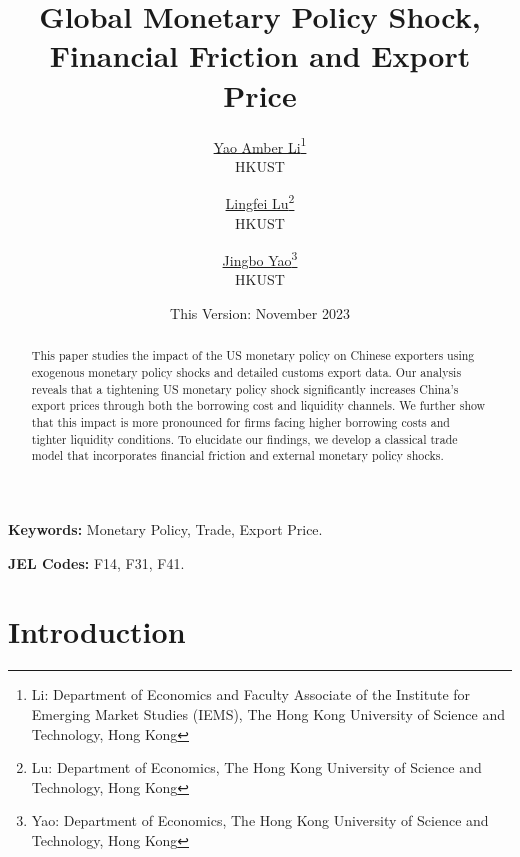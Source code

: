 

\linespread{1.2}
\geometry{a4paper,scale=0.75}
\setlength{\parskip}{0.5em}




\title{\Large \textbf{Global Monetary Policy Shock, Financial Friction and Export Price}}

\author{\large \href{http://yaoli.people.ust.hk/}{Yao Amber Li}\thanks{Li: Department of Economics and Faculty Associate of the Institute for Emerging Market Studies (IEMS), The Hong Kong University of Science and Technology, Hong Kong}\\ \large{HKUST}
\medskip
\and \href{}{Lingfei Lu}\thanks{Lu: Department of Economics, The Hong Kong University of Science and Technology, Hong Kong } \\ \large{HKUST}
\medskip
\and \href{}{Jingbo Yao}\thanks{Yao: Department of Economics, The Hong Kong University of Science and Technology, Hong Kong} \\ \large{HKUST}
}
\date{This Version: November 2023}

\maketitle

\begin{abstract}
This paper studies the impact of the US monetary policy on Chinese exporters using exogenous monetary policy shocks and detailed customs export data. Our analysis reveals that a tightening US monetary policy shock significantly increases China's export prices through both the borrowing cost and liquidity channels. We further show that this impact is more pronounced for firms facing higher borrowing costs and tighter liquidity conditions. To elucidate our findings, we develop a classical trade model that incorporates financial friction and external monetary policy shocks.

\end{abstract}

\textbf{Keywords:} Monetary Policy, Trade, Export Price.

\textbf{JEL Codes:} F14, F31, F41.
\newpage

\tableofcontents

\newpage
\section{Introduction}


